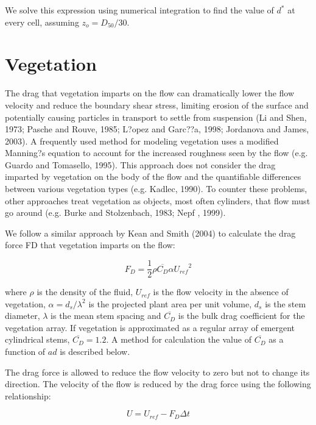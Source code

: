 \documentclass[11pt]{article}
\begin{document}
We solve this expression using numerical integration to find the value of $d^*$ at every cell, assuming $z_o = D_{50}/30$.

\section{Vegetation}

The drag that vegetation imparts on the flow can dramatically lower the flow velocity and reduce the boundary shear stress, limiting erosion of the surface and potentially causing particles in transport to settle from suspension (Li and Shen, 1973; Pasche and Rouve, 1985; L?opez and Garc??a, 1998; Jordanova and James, 2003). A frequently used method for modeling vegetation uses a modified Manning?s equation to account for the increased roughness seen by the flow (e.g. Guardo and Tomasello, 1995). This approach does not consider the drag imparted by vegetation on the body of the flow and the quantifiable differences between various vegetation types (e.g. Kadlec, 1990). To counter these problems, other approaches treat vegetation as objects, most often cylinders, that flow must go around (e.g. Burke and Stolzenbach, 1983; Nepf , 1999).

We follow a similar approach by Kean and Smith (2004) to calculate the drag force FD that vegetation imparts on the flow:

\begin{equation}
F_D = \frac{1}{2} \rho \overline{C_D} \alpha {U_{ref}}^2
\end{equation}

\noindent where $\rho$ is the density of the fluid, $U_{ref}$ is the flow velocity in the absence of vegetation, $\alpha=d_s/\lambda^2$ is the projected plant area per unit volume, $d_s$ is the stem diameter, $\lambda$ is the mean stem spacing and $\overline{C_D}$ is the bulk drag coefficient for the vegetation array. If vegetation is approximated as a regular array of emergent cylindrical stems, $\overline{C_D} = 1.2$. A method for calculation the value of $\overline{C_D}$ as a function of $ad$ is described below.

The drag force is allowed to reduce the flow velocity to zero but not to change its direction. The velocity of the flow is reduced by the drag force using the following relationship:

\begin{equation}
U = U_{ref} - F_D \Delta t
\end{equation}
\end{document}
